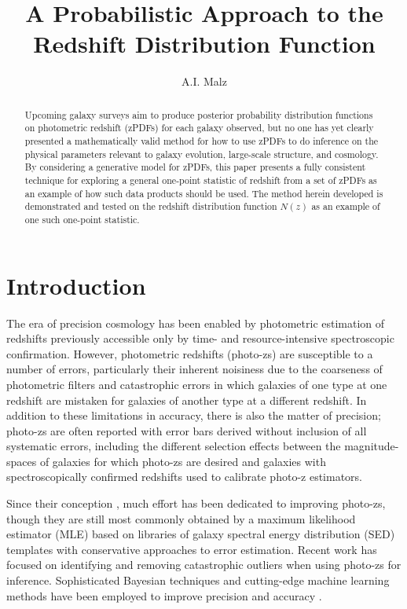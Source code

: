 \documentclass[preprint]{aastex}
\begin{document}
\title{A Probabilistic Approach to the Redshift Distribution Function}

\author{A.I. Malz}

\begin{abstract}
Upcoming galaxy surveys aim to produce posterior probability distribution functions on photometric redshift (zPDFs) for each galaxy observed, but no one has yet clearly presented a mathematically valid method for how to use zPDFs to do inference on the physical parameters relevant to galaxy evolution, large-scale structure, and cosmology.  By considering a generative model for zPDFs, this paper presents a fully consistent technique for exploring a general one-point statistic of redshift from a set of zPDFs as an example of how such data products should be used.  The method herein developed is demonstrated and tested on the redshift distribution function $N(z)$ as an example of one such one-point statistic.
\end{abstract}


\section{Introduction}
\label{sec:intro}

The era of precision cosmology has been enabled by photometric estimation of redshifts previously accessible only by time- and resource-intensive spectroscopic confirmation.  However, photometric redshifts (photo-zs) are susceptible to a number of errors, particularly their inherent noisiness due to the coarseness of photometric filters and catastrophic errors in which galaxies of one type at one redshift are mistaken for galaxies of another type at a different redshift.  In addition to these limitations in accuracy, there is also the matter of precision; photo-zs are often reported with error bars derived without inclusion of all systematic errors, including the different selection effects between the magnitude-spaces of galaxies for which photo-zs are desired and galaxies with spectroscopically confirmed redshifts used to calibrate photo-z estimators.

Since their conception \citep{bau62}, much effort has been dedicated to improving photo-zs, though they are still most commonly obtained by a maximum likelihood estimator (MLE) based on libraries of galaxy spectral energy distribution (SED) templates with conservative approaches to error estimation.  Recent work has focused on identifying and removing catastrophic outliers when using photo-zs for inference.  \citep{gor13}  Sophisticated Bayesian techniques and cutting-edge machine learning methods have been employed to improve precision \citep{car10} and accuracy \citep{sad15}. 
\end{document}
